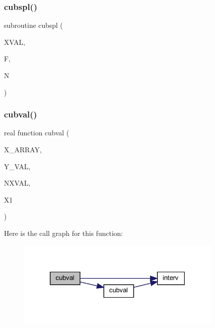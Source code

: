 \subsubsection{\texorpdfstring{cubspl()}{cubspl()}}
{\footnotesize\ttfamily subroutine cubspl (\begin{DoxyParamCaption}\item[{real, dimension(n)}]{X\+V\+AL,  }\item[{real, dimension(4,n)}]{F,  }\item[{integer}]{N }\end{DoxyParamCaption})}

\mbox{\label{Leroi__c_8f90_a7cfee47c046d9dadca7ccd1059bd30ac}} 
\subsubsection{\texorpdfstring{cubval()}{cubval()}}
{\footnotesize\ttfamily real function cubval (\begin{DoxyParamCaption}\item[{real, dimension(nxval), intent(in)}]{X\+\_\+\+A\+R\+R\+AY,  }\item[{real, dimension(4,nxval), intent(in)}]{Y\+\_\+\+V\+AL,  }\item[{integer, intent(in)}]{N\+X\+V\+AL,  }\item[{real, intent(in)}]{X1 }\end{DoxyParamCaption})}

Here is the call graph for this function\+:\nopagebreak
\begin{figure}[H]
\begin{center}
\leavevmode
\includegraphics[width=283pt]{Leroi__c_8f90_a7cfee47c046d9dadca7ccd1059bd30ac_cgraph}
\end{center}
\end{figure}
\mbox{\label{Leroi__c_8f90_a7ac3bb5f2b2d31402aa81424ee2be857}} 
